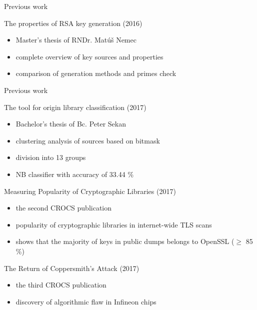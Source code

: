 \documentclass{beamer}
\newcommand\Fontsmall{\fontsize{8}{7.2}\selectfont}
\begin{document}
\begin{darkframes}
\begin{frame}{Previous work}
    
    \begin{exampleblock}{The properties of RSA key generation (2016)}
      \begin{itemize}
        \item Master's thesis of RNDr. Matúš Nemec
        \item complete overview of key sources and properties
        \item comparison of generation methods and primes check
      \end{itemize}
    \end{exampleblock}
    \end{frame}
    
    \begin{frame}{Previous work}     
    \Fontsmall    
    \begin{exampleblock}{The tool for origin library classification (2017)}
      \begin{itemize}
        \item Bachelor's thesis of Bc. Peter Sekan
        \item clustering analysis of sources based on bitmask
        \item division into 13 groups
        \item NB classifier with accuracy of 33.44 \%
      \end{itemize}
    \end{exampleblock}
    
    \begin{exampleblock}{Measuring Popularity of Cryptographic Libraries (2017)}
      \begin{itemize}
        \item the second CROCS publication
        \item popularity of cryptographic libraries in internet-wide TLS scans
        \item shows that the majority of keys in public dumps belongs to OpenSSL ($\geq$ 85 \%)
      \end{itemize}
    \end{exampleblock}
    
    \begin{exampleblock}{The Return of Coppersmith’s Attack (2017)}
      \begin{itemize}
        \item the third CROCS publication
        \item discovery of algorithmic flaw in Infineon chips
      \end{itemize}
    \end{exampleblock}
    

\end{frame}
\end{darkframes}
\end{document}
